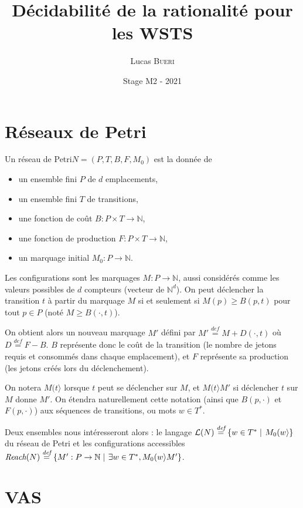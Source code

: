 \documentclass[a4paper,final]{article}
\title{Décidabilité de la rationalité pour les WSTS}
\author{Lucas \textsc{Bueri}}
\date{Stage M2 - 2021}
\theoremstyle{definition}
\let\geq\geqslant
\newcommand{\set}[2]{\left\{#1\mathrel{\left|\vphantom{#1}\vphantom{#2}\right.}#2\right\}}
\newcommand{\defeq}{\ensuremath{\stackrel{\textit{def}}{=}}}
\newcommand{\N}{\ensuremath{\mathbb{N}}}
\newcommand{\petri}{réseau de Petri\xspace}
\newcommand{\fire}[2]{\ensuremath{#1 (#2\rangle}}
\newcommand{\lang}{\ensuremath{\mathcal{L}}}
\newcommand{\reach}{\ensuremath{\textit{Reach}}}
\begin{document}
\maketitle


\section{Réseaux de Petri}

Un \petri $N = (P,T,B,F,M_0)$ est la donnée de
\begin{itemize}
    \item un ensemble fini $P$ de $d$ emplacements,
    \item un ensemble fini $T$ de transitions,
    \item une fonction de coût $B: P\times T\to\N$,
    \item une fonction de production $F: P\times T\to\N$,
    \item un marquage initial $M_0: P\to\N$.
\end{itemize}

Les configurations sont les marquages $M: P\to\N$, aussi considérés comme les valeurs possibles de $d$ compteurs (vecteur de $\N^d$).
On peut déclencher la transition $t$ à partir du marquage $M$ si et
seulement si $M(p)\geq B(p,t)$ pour tout $p\in P$ (noté $M\geq B(\cdot,t)$).

On obtient alors un nouveau marquage $M'$ défini par $M' \defeq M+D(\cdot,t)$ où $D\defeq F-B$. 
$B$ représente donc le coût de la transition (le nombre de jetons requis et consommés dans chaque emplacement), et $F$ représente sa production (les jetons créés lors du déclenchement).

On notera $\fire{M}{t}$ lorsque $t$ peut se déclencher sur $M$, et $\fire{M}{t}M'$ si déclencher $t$ sur $M$ donne $M'$.
On étendra naturellement cette notation (ainsi que $B(p,\cdot)$ et $F(p,\cdot)$) aux séquences de transitions, ou mots $w\in T^\ast$.

Deux ensembles nous intéresseront alors : le langage $\lang(N)\defeq \set{w\in T^\ast} {\fire{M_0}{w}}$ du \petri et les configurations accessibles $\reach(N)\defeq \set{M':P\to\N}{\exists w\in T^\ast, \fire{M_0}{w}M'}$.


\section{VAS}
\end{document}
